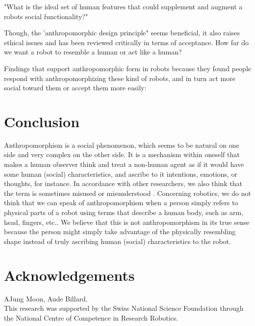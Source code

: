 \documentclass{acm_proc_article-sp}
\begin{document}
"What is the ideal set of human features that could supplement and augment a
robots  social functionality?" \cite{duffy_anthropomorphism_2002}


Though, the 'anthropomorphic design principle" seems beneficial, it also raises
ethical issues and has been reviewed critically in terms of acceptance. How far
do we want a robot to resemble a human or act like a human?

Findings that support anthropomorphic form in robots because they found people
respond with anthropomorphizing these kind of robots, and in turn act more
social toward them or accept them more easily:




\section{Conclusion}
\label{sec:9}


Anthropomorphism is a social phenomenon, which seems to be natural on one side
and very complex on the other side. It is a mechanism within oneself that makes
a human observer think and treat a non-human agent as if it would have some
human (social) characteristics, and ascribe to it intentions, emotions, or
thoughts, for instance. In accordance with other researchers, we also think
that the term is sometimes misused or misunderstood
\cite{duffy_anthropomorphism_2002}. Concerning robotics, we do not think that
we can speak of anthropomorphism when a person simply refers to physical parts
of a robot using terms that describe a human body, such as arm, head, fingers,
etc.. We believe that this is not anthropomorphism in its true sense because
the person might simply take advantage of the physically resembling shape
instead of truly ascribing human (social) characteristics to the robot.



\section*{Acknowledgements}
AJung Moon, Aude Billard.\\

This research was supported by the Swiss National Science Foundation through
the National Centre of Competence in Research Robotics.



 
\balancecolumns
\end{document}
